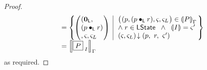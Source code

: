 \begin{lemma}
\begin{proof}
\[\begin{array}{r l}
	
	& =
	\left\{
	\hspace*{-0.2cm}
	\begin{array}{l | l}
		\left(
		\hspace*{-0.15cm}
		\begin{array}{l}
		(\unitL, \\
		(p \composeL r)\\
		, \amod{}, \amod{L}
		\end{array}
		\hspace*{-0.15cm}
		\right)
		&
		\hspace*{-0.1cm}
		\begin{array}{l}
			\left(
			\hspace*{-0.15cm}
			\begin{array}{l}
			(p, 
			(p \composeL r)
			, \amod{}, \amod{L}
			\end{array}
			\hspace*{-0.15cm}
			\right) \in \intermediateSem[\lenv]{P}\\
			
			
			\land\; r \in \LState \;\;\land\;\; \intermediateSemI{I} = \amod{}'\\
			
			\extendsAM{\amod{}, \amod{L}}{p}{\ r}{\ \amod{}'}
		\end{array}
		\hspace*{-0.1cm}
	\end{array}
	\hspace*{-0.2cm}
	\right\} \\
	
	
	& = \sem[\lenv]{\shared{P}{I}}
\end{array}
\]
%
as required.
\end{proof}
%
\end{lemma}

